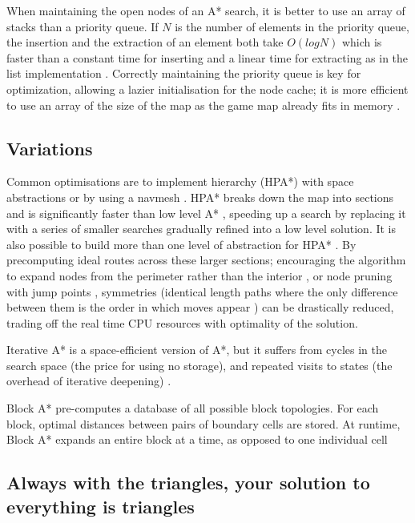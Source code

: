 \documentclass{scrartcl}
\begin{document}
When maintaining the open nodes of an A* search, it is better to use an array of stacks than a priority queue. If $N$ is the number of elements in the priority queue, the insertion and the extraction of an element both take $O(log N)$ which is faster than a constant time for inserting and a linear time for extracting as in the list implementation \cite{cazenave2006optimizations}.  Correctly maintaining the priority queue is key for optimization, allowing a lazier initialisation for the node cache; it is more efficient to use an array of the size of the map as the game map already fits in memory \cite{cazenave2006optimizations}.

\subsection*{Variations}

Common optimisations are to implement hierarchy (HPA*) with space abstractions or by using a navmesh \cite{cui2011based}.  HPA* breaks down the map into sections and is significantly faster than low level A* \cite{botea2004near}, speeding up a search by replacing it with a series of smaller searches \cite{botea2013pathfinding} gradually refined into a low level solution.  It is also possible to build more than one level of abstraction for HPA* \cite {jansen2007hpa}. By precomputing ideal routes across these larger sections; encouraging the algorithm to expand nodes from the perimeter rather than the interior \cite{harabor2012fast}, or node pruning with jump points \cite{harabor2011online}, symmetries (identical length paths where the only difference between them is the order in which moves appear \cite{harabor2012fast}) can be drastically reduced, trading off the real time CPU resources with optimality of the solution. 

Iterative A* is a space-efficient version of A*, but it suffers from cycles in the search space (the price for using no storage), and repeated visits to states (the overhead of iterative deepening) \cite{bjornsson2005fringe}.

Block A* pre-computes a database of all possible block topologies.  For each block, optimal distances between pairs of boundary cells are stored.  At runtime, Block A* expands an entire block at a time, as opposed to one individual cell \cite{botea2013pathfinding}

\subsection*{Always with the triangles, your solution to everything is triangles}
\end{document}

